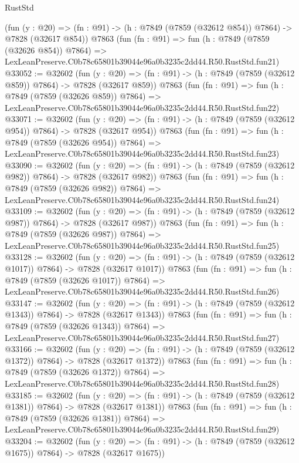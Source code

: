\begin{lexlean}{RustStd}
\begin{coremodule}
    (fun (y : @20) => (fn : @91) -> (h : @7849 (@7859 (@32612 @854)) @7864) -> @7828 (@32617 @854))
    @7863
    (fun (fn : @91) =>
    fun (h : @7849 (@7859 (@32626 @854)) @7864) =>
    LexLeanPreserve.C0b78c65801b39044e96a0b3235c2dd44.R50.RustStd.fun21)
@33052 := @32602
    (fun (y : @20) => (fn : @91) -> (h : @7849 (@7859 (@32612 @859)) @7864) -> @7828 (@32617 @859))
    @7863
    (fun (fn : @91) =>
    fun (h : @7849 (@7859 (@32626 @859)) @7864) =>
    LexLeanPreserve.C0b78c65801b39044e96a0b3235c2dd44.R50.RustStd.fun22)
@33071 := @32602
    (fun (y : @20) => (fn : @91) -> (h : @7849 (@7859 (@32612 @954)) @7864) -> @7828 (@32617 @954))
    @7863
    (fun (fn : @91) =>
    fun (h : @7849 (@7859 (@32626 @954)) @7864) =>
    LexLeanPreserve.C0b78c65801b39044e96a0b3235c2dd44.R50.RustStd.fun23)
@33090 := @32602
    (fun (y : @20) => (fn : @91) -> (h : @7849 (@7859 (@32612 @982)) @7864) -> @7828 (@32617 @982))
    @7863
    (fun (fn : @91) =>
    fun (h : @7849 (@7859 (@32626 @982)) @7864) =>
    LexLeanPreserve.C0b78c65801b39044e96a0b3235c2dd44.R50.RustStd.fun24)
@33109 := @32602
    (fun (y : @20) => (fn : @91) -> (h : @7849 (@7859 (@32612 @987)) @7864) -> @7828 (@32617 @987))
    @7863
    (fun (fn : @91) =>
    fun (h : @7849 (@7859 (@32626 @987)) @7864) =>
    LexLeanPreserve.C0b78c65801b39044e96a0b3235c2dd44.R50.RustStd.fun25)
@33128 := @32602
    (fun (y : @20) =>
    (fn : @91) -> (h : @7849 (@7859 (@32612 @1017)) @7864) -> @7828 (@32617 @1017))
    @7863
    (fun (fn : @91) =>
    fun (h : @7849 (@7859 (@32626 @1017)) @7864) =>
    LexLeanPreserve.C0b78c65801b39044e96a0b3235c2dd44.R50.RustStd.fun26)
@33147 := @32602
    (fun (y : @20) =>
    (fn : @91) -> (h : @7849 (@7859 (@32612 @1343)) @7864) -> @7828 (@32617 @1343))
    @7863
    (fun (fn : @91) =>
    fun (h : @7849 (@7859 (@32626 @1343)) @7864) =>
    LexLeanPreserve.C0b78c65801b39044e96a0b3235c2dd44.R50.RustStd.fun27)
@33166 := @32602
    (fun (y : @20) =>
    (fn : @91) -> (h : @7849 (@7859 (@32612 @1372)) @7864) -> @7828 (@32617 @1372))
    @7863
    (fun (fn : @91) =>
    fun (h : @7849 (@7859 (@32626 @1372)) @7864) =>
    LexLeanPreserve.C0b78c65801b39044e96a0b3235c2dd44.R50.RustStd.fun28)
@33185 := @32602
    (fun (y : @20) =>
    (fn : @91) -> (h : @7849 (@7859 (@32612 @1381)) @7864) -> @7828 (@32617 @1381))
    @7863
    (fun (fn : @91) =>
    fun (h : @7849 (@7859 (@32626 @1381)) @7864) =>
    LexLeanPreserve.C0b78c65801b39044e96a0b3235c2dd44.R50.RustStd.fun29)
@33204 := @32602
    (fun (y : @20) =>
    (fn : @91) -> (h : @7849 (@7859 (@32612 @1675)) @7864) -> @7828 (@32617 @1675))

\end{coremodule}
\end{lexlean}
